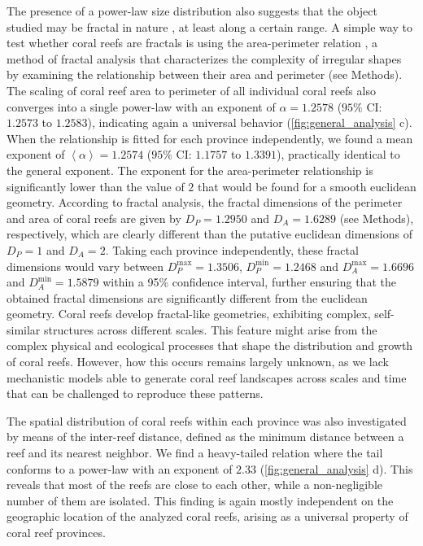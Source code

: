 The presence of a power-law size distribution also suggests that the object
studied may be fractal in nature \cite{Mori2020, PINTO2014, Seekell2013,
    Sorensen1999, Vidondo1997}, at least along a certain range. A simple way to
test whether coral reefs are fractals is using the area-perimeter relation
\cite{MAN83, Lovejoy1982}, a method of fractal analysis that characterizes the
complexity of irregular shapes by examining the relationship between their area
and perimeter (see Methods). The scaling of coral reef area to perimeter of all
individual coral reefs also converges into a single power-law with an exponent
of $\alpha=1.2578$ ($95\%$ CI: $1.2573$ to $1.2583$), indicating again a
universal behavior (\cref{fig:general_analysis} c). When the relationship is
fitted for each province independently, we found a mean exponent of
$\left<\alpha\right>=1.2574$ ($95\%$ CI: $1.1757$ to $1.3391$), practically
identical to the general exponent. The exponent for the area-perimeter
relationship is significantly lower than the value of $2$ that would be found
for a smooth euclidean geometry. According to fractal analysis, the fractal
dimensions of the perimeter and area of coral reefs are given by $D_P=1.2950$
and $D_A=1.6289$ (see Methods), respectively, which are clearly different than
the putative euclidean dimensions of $D_P=1$ and $D_A=2$. Taking each province
independently, these fractal dimensions would vary between
$D_P^{\mathrm{max}}=1.3506$, $D_P^{\mathrm{min}}=1.2468$ and
$D_A^{\mathrm{max}}=1.6696$ and $D_A^{\mathrm{min}}=1.5879$ within a 95\%
confidence interval, further ensuring that the obtained fractal dimensions are
significantly different from the euclidean geometry. Coral reefs develop
fractal-like geometries, exhibiting complex, self-similar structures across
different scales. This feature might arise from the complex physical and
ecological processes that shape the distribution and growth of coral reefs.
However, how this occurs remains largely unknown, as we lack mechanistic models
able to generate coral reef landscapes across scales and time that can be
challenged to reproduce these patterns.

The spatial distribution of coral reefs within each province was also
investigated by means of the inter-reef distance, defined as the minimum
distance between a reef and its nearest neighbor. We find a heavy-tailed
relation where the tail conforms to a power-law with an exponent of $2.33$
(\cref{fig:general_analysis} d). This reveals that most of the reefs are close
to each other, while a non-negligible number of them are isolated. This finding
is again mostly independent on the geographic location of the analyzed coral
reefs, arising as a universal property of coral reef provinces.


